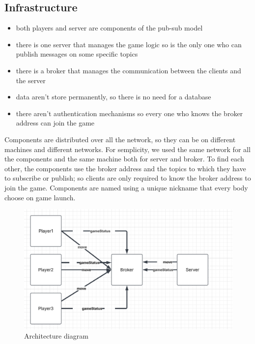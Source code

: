 \documentclass{scrartcl}
\begin{document}
\subsection{Infrastructure}\label{infrastructure}

\begin{itemize}
      \item both players and server are components of the pub-sub model
      \item there is one server that manages the game logic so is the only one who can publish messages on some specific topics
      \item there is a broker that manages the communication between the clients and the server
      \item data aren't store permanently, so there is no need for a database
      \item there aren't authentication mechanisms so every one who knows the broker address can join the game

\end{itemize}
Components are distributed over all the network, so they can be on different machines and different networks. For semplicity, we used the same network for all the components and the same machine both for server and broker. \newline
To find each other, the components use the broker address and the topics to which they have to subscribe or publish; so clients are only required to know the broker address to join the game. \newline
Components are named using a unique nickname that every body choose on game launch.


\begin{figure}[H]
      \caption{Architecture diagram}
      \centering
      \includegraphics[scale=0.5]{figures/pubsubdiagram.png}
\end{figure}
\end{document}
